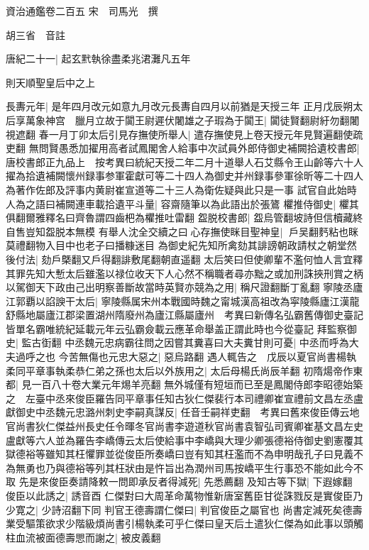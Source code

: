資治通鑑卷二百五
宋　司馬光　撰

胡三省　音註

唐紀二十一|{
	起玄黓執徐盡柔兆涒灘凡五年}


則天順聖皇后中之上

長夀元年|{
	是年四月改元如意九月改元長夀自四月以前猶是天授三年}
正月戊辰朔太后享萬象神宫　臘月立故于闐王尉遲伏闍雄之子瑕為于闐王|{
	闐徒賢翻尉紆勿翻闍視遮翻}
春一月丁卯太后引見存撫使所舉人|{
	遣存撫使見上卷天授元年見賢遍翻使疏吏翻}
無問賢愚悉加擢用高者試鳳閣舍人給事中次試員外郎侍御史補闕拾遺校書郎|{
	唐校書郎正九品上　按考異曰統紀天授二年二月十道舉人石艾縣令王山齡等六十人擢為拾遺補闕懷州録事参軍霍獻可等二十四人為御史并州録事參軍徐昕等二十四人為著作佐郎及評事内黄尉崔宣道等二十三人為衛佐疑與此只是一事}
試官自此始時人為之語曰補闕連車載拾遺平斗量|{
	容齋隨筆以為此語出於張鷟}
欋推侍御史|{
	欋其俱翻爾雅釋名曰齊魯謂四齒杷為欋推吐雷翻}
盌脱校書郎|{
	盌烏管翻坡詩但信櫝藏終自售豈知盌脱本無模}
有舉人沈全交續之曰心存撫使眯目聖神皇|{
	戶吴翻麫粘也眯莫禮翻物入目中也老子曰播糠迷目}
為御史紀先知所禽劾其誹謗朝政請杖之朝堂然後付法|{
	劾戶槩翻又戶得翻誹敷尾翻朝直遥翻}
太后笑曰但使卿輩不濫何恤人言宜釋其罪先知大慙太后雖濫以禄位收天下人心然不稱職者尋亦黜之或加刑誅挾刑賞之柄以駕御天下政由己出明察善斷故當時英賢亦競為之用|{
	稱尺證翻斷丁亂翻}
寧陵丞廬江郭覇以諂諛干太后|{
	寧陵縣属宋州本戰國時魏之甯城漢高祖改為寜陵縣廬江漢龍舒縣地屬廬江郡梁置湖州隋廢州為廬江縣屬廬州　考異曰新傳名弘霸舊傳御史臺記皆單名霸唯統紀延載元年云弘霸僉載云應革命舉盖正謂此時也今從臺記}
拜監察御史|{
	監古衘翻}
中丞魏元忠病霸往問之因嘗其糞喜曰大夫糞甘則可憂|{
	中丞而呼為大夫過呼之也}
今苦無傷也元忠大惡之|{
	惡烏路翻}
遇人輒告之　戊辰以夏官尚書楊執柔同平章事執柔恭仁弟之孫也太后以外族用之|{
	太后母楊氏尚辰羊翻}
初隋煬帝作東都|{
	見一百八十卷大業元年焬羊亮翻}
無外城僅有短垣而已至是鳳閣侍郎李昭德始築之　左臺中丞來俊臣羅告同平章事任知古狄仁傑裴行本司禮卿崔宣禮前文昌左丞盧獻御史中丞魏元忠潞州刺史李嗣真謀反|{
	任音壬嗣祥吏翻　考異曰舊來俊臣傳云地官尚書狄仁傑益州長史任令暉冬官尚書李遊道秋官尚書袁智弘司賓卿崔基文昌左史盧獻等六人並為羅告李嶠傳云太后使給事中李嶠與大理少卿張德裕侍御史劉憲覆其獄德裕等雖知其枉懼罪並從俊臣所奏嶠曰豈有知其枉濫而不為申明哉孔子曰見義不為無勇也乃與德裕等列其枉狀由是忤旨出為潤州司馬按嶠平生行事恐不能如此今不取}
先是來俊臣奏請降敕一問即承反者得減死|{
	先悉薦翻}
及知古等下獄|{
	下遐嫁翻}
俊臣以此誘之|{
	誘音酉}
仁傑對曰大周革命萬物惟新唐室舊臣甘從誅戮反是實俊臣乃少寛之|{
	少詩沼翻下同}
判官王德壽謂仁傑曰|{
	判官俊臣之屬官也}
尚書定減死矣德壽業受驅策欲求少階級煩尚書引楊執柔可乎仁傑曰皇天后土遣狄仁傑為如此事以頭觸柱血流被面德壽愳而謝之|{
	被皮義翻}
